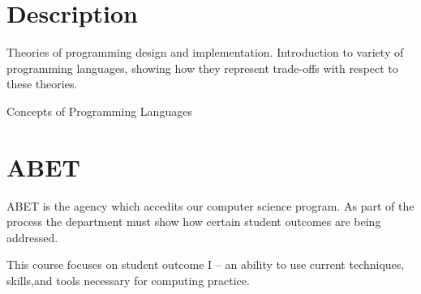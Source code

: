 \documentclass{syllabus}
\begin{document}
\section*{Description}
Theories of programming design and implementation. Introduction to variety of programming languages, showing how they represent trade-offs with respect to these theories.

\begin{text}{Concepts of Programming Languages}
\end{text}

\begin{grading}
\end{grading}




\section*{ABET}
ABET is the agency which accedits our computer science program.  As part of the process the department must show how certain student outcomes are being addressed.

This course focuses on student outcome I -- an ability to use current techniques, skills,and tools necessary for computing practice.

\cheating

\ada

\end{document}
